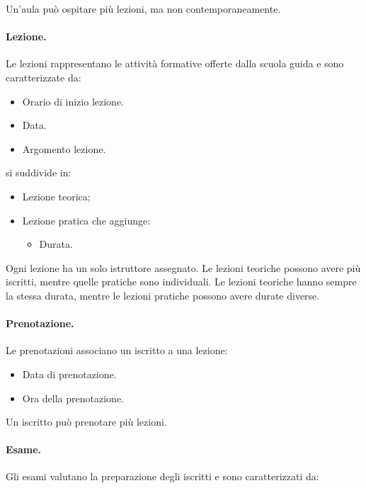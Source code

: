 \documentclass[10pt,twoside]{article}
\begin{document}
{    Un’aula può ospitare più lezioni, ma non contemporaneamente.
    

    \paragraph{Lezione.}
    Le lezioni rappresentano le attività formative offerte dalla scuola guida e sono caratterizzate da: 
    
    \begin{itemize}
        \item Orario di inizio lezione.
        \item Data.
        \item Argomento lezione.
    \end{itemize}
    
    si suddivide in:

    \begin{itemize}
        \item Lezione teorica;
        \item Lezione pratica che aggiunge:
        \begin{itemize}
            \item Durata.
        \end{itemize}
    \end{itemize}

    Ogni lezione ha un solo istruttore assegnato. Le lezioni teoriche possono avere più iscritti, mentre quelle pratiche sono individuali. Le lezioni teoriche hanno sempre la stessa durata, mentre le lezioni pratiche possono avere durate diverse.
    

    \paragraph{Prenotazione.}
    Le prenotazioni associano un iscritto a una lezione:

    \begin{itemize}
        \item Data di prenotazione. 
        \item Ora della prenotazione.
    \end{itemize}

    Un iscritto può prenotare più lezioni.
    

    \paragraph{Esame.}
    Gli esami valutano la preparazione degli iscritti e sono caratterizzati da:

}
\end{document}
